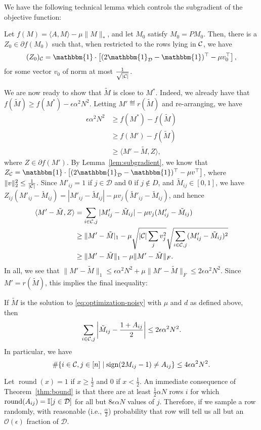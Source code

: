 \documentclass[11pt]{article}
\newcommand{\M}{\tilde{M}}
\newcommand{\sD}{\mathcal{D}}
\newcommand{\oo}{\mathcal{O}}
\newcommand{\bi}{\mathbbm{1}}
\DeclareMathOperator{\round}{round}
\begin{document}
We have the following technical lemma which controls 
the subgradient of the objective function:
\begin{lemma}
\label{lem:subgradient}
Let $f(M) = \langle A, M \rangle - \mu \|M\|_*$, and let 
$M_0$ satisfy $M_0 = PM_0$. Then,
there is a $Z_0 \in \partial f(M_0)$ such that, when restricted 
to the rows lying in $\mathcal{C}$, we have
\[ (Z_0)_{\sC} = \bi \cdot \left[(2\bi_{\sD}-\bi)^{\top} - \mu v_0^{\top}\right], \]
for some vector $v_0$ of norm at most $\frac{1}{\sqrt{|\mathcal{C}|}}$.
\end{lemma}

We are now ready to show that $\M$ is close to $M^*$. Indeed, we already 
have that $f(\M) \geq f(M^*) - \epsilon \alpha^2 N^2$. Letting $M' \eqdef r(\M)$ 
and re-arranging, we have
\begin{align}
\epsilon \alpha^2 N^2 &\geq f(M^*) - f(\M) \\
 &\geq f(M') - f(\M) \\
 &\geq \langle M' - \M, Z \rangle,
\end{align}
where $Z \in \partial f(M')$.
By Lemma~\ref{lem:subgradient}, we know that $Z_{\sC} = \bi \cdot \left[(2\bi_{\sD}-\bi)^{\top} - \mu v^{\top}\right]$, 
where $\|v\|_2^2 \leq \frac{1}{|\mathcal{C}|}$. Since $M'_{ij} = 1$ if $j \in \sD$ and $0$ if $j \not\in D$, and 
$\M_{ij} \in [0,1]$, we have $Z_{ij}(M'_{ij}-\M_{ij}) = |M'_{ij} - \M_{ij}| - \mu v_j(\M'_{ij}-\M_{ij})$, and hence
\begin{align}
\langle M' - \M, Z \rangle &= \sum_{i \in \sC, j} |M'_{ij} - \M_{ij}| - \mu v_j (M'_{ij} - \M_{ij}) \\
 &\geq \|M'-\M|_1 - \mu \sqrt{|\sC|\sum_j v_j^2}\sqrt{\sum_{i \in \sC, j} (M_{ij}'-\M_{ij})^2} \\
 &\geq \|M'-\M\|_1 - \mu \|M' - \M\|_F.
\end{align}
In all, we see that $\|M'-\M\|_1 \leq \epsilon \alpha^2 N^2 + \mu \|M' - \M\|_F \leq 2\epsilon \alpha^2 N^2$.
Since $M' = r(\M)$, this implies the final inequality:
\begin{theorem}
\label{thm:bound}
If $\M$ is the solution to \eqref{eq:optimization-noisy} with $\mu$ and $d$ as defined 
above, then
\[ \sum_{i \in \sC, j} \left|\M_{ij} - \frac{1+A_{ij}}{2}\right| \leq 2\epsilon\alpha^2N^2. \]
In particular, we have
\[ \#\{i \in \mathcal{C}, j \in [n] \mid \operatorname{sign}(2M_{ij}-1) \neq A_{ij}\} \leq 4\epsilon\alpha^2N^2. \]
\end{theorem}
Let $\round(x) = 1$ if $x \geq \frac{1}{2}$ and $0$ if $x < \frac{1}{2}$. An immediate consequence 
of Theorem~\ref{thm:bound} is that 
there are at least $\frac{1}{2}\alpha N$ rows $i$ for which $\round(A_{ij}) = \bI[j \in \sD]$ 
for all but $8\epsilon \alpha N$ values of $j$. Therefore, if we sample a row randomly, with 
reasonable (i.e., $\frac{\alpha}{2}$) probability that row will tell us all but an $\oo(\epsilon)$ fraction of $\sD$.
\end{document}

